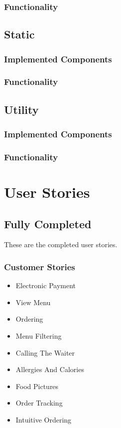 \documentclass[12pt, twoside, a4paper]{report}
\begin{document}
\subsection*{Functionality}

\section*{Static}\label{sec:static}
\subsection*{Implemented Components}
\subsection*{Functionality}

\section*{Utility}\label{sec:util}
\subsection*{Implemented Components}
\subsection*{Functionality}

\chapter*{User Stories}
\section*{Fully Completed}
These are the completed user stories.
\subsection*{Customer Stories}
\begin{itemize}
  \item Electronic Payment
  \item View Menu
  \item Ordering
  \item Menu Filtering
  \item Calling The Waiter
  \item Allergies And Calories
  \item Food Pictures
  \item Order Tracking
  \item Intuitive Ordering
\end{itemize}
\end{document}
